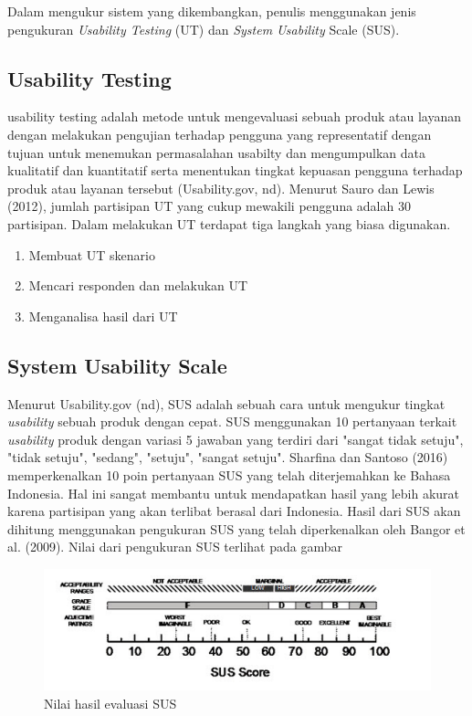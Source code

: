 Dalam mengukur sistem yang dikembangkan, penulis menggunakan jenis pengukuran \textit{Usability Testing} (UT) dan \textit{System Usability} Scale (SUS).
	\subsection{Usability Testing}
	usability testing adalah metode untuk mengevaluasi sebuah produk atau layanan dengan melakukan pengujian terhadap pengguna yang representatif dengan tujuan untuk menemukan permasalahan usabilty dan mengumpulkan data kualitatif dan kuantitatif serta menentukan tingkat kepuasan pengguna terhadap produk atau layanan tersebut (Usability.gov, nd).
	\linebreak\linebreak
	Menurut Sauro dan Lewis (2012), jumlah partisipan UT yang cukup mewakili pengguna adalah 30 partisipan. Dalam melakukan UT terdapat tiga langkah yang biasa digunakan.
	\begin{enumerate}
		\item Membuat UT skenario
		\item Mencari responden dan melakukan UT
		\item Menganalisa hasil dari UT
	\end{enumerate}
	 
	\subsection{System Usability Scale}
	Menurut Usability.gov (nd), SUS adalah sebuah cara untuk mengukur tingkat \textit{usability} sebuah produk dengan cepat. SUS menggunakan 10 pertanyaan terkait \textit{usability} produk dengan variasi 5 jawaban yang terdiri dari "sangat tidak setuju", "tidak setuju", "sedang", "setuju", "sangat setuju". Sharfina dan Santoso (2016) memperkenalkan 10 poin pertanyaan SUS yang telah diterjemahkan ke Bahasa Indonesia. Hal ini sangat membantu untuk mendapatkan hasil yang lebih akurat karena partisipan yang akan terlibat berasal dari Indonesia.
	\linebreak\linebreak
	Hasil dari SUS akan dihitung menggunakan pengukuran SUS yang telah diperkenalkan oleh Bangor et al. (2009). Nilai dari pengukuran SUS terlihat pada gambar
	\begin{figure}
		\includegraphics{pics/susscore}
		\caption{Nilai hasil evaluasi SUS}
		\centering
	\end{figure}